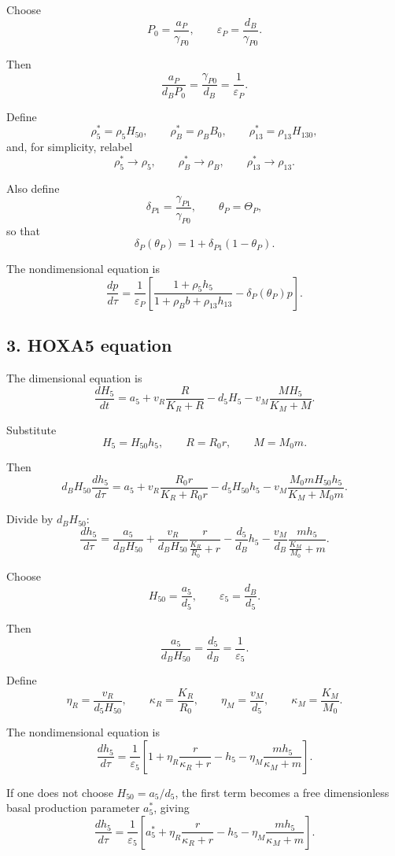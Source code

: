\documentclass[11pt]{article}
\begin{document}
Choose
\[
P_0=\frac{a_P}{\gamma_{P0}},
\qquad
\varepsilon_P=\frac{d_B}{\gamma_{P0}}.
\]

Then
\[
\frac{a_P}{d_BP_0}
=
\frac{\gamma_{P0}}{d_B}
=
\frac{1}{\varepsilon_P}.
\]

Define
\[
\rho_5^*=\rho_5H_{50},\qquad
\rho_B^*=\rho_BB_0,\qquad
\rho_{13}^*=\rho_{13}H_{130},
\]
and, for simplicity, relabel
\[
\rho_5^*\to \rho_5,\qquad
\rho_B^*\to \rho_B,\qquad
\rho_{13}^*\to \rho_{13}.
\]

Also define
\[
\delta_{P1}=\frac{\gamma_{P1}}{\gamma_{P0}},
\qquad
\theta_P=\Theta_P,
\]
so that
\[
\delta_P(\theta_P)=1+\delta_{P1}(1-\theta_P).
\]

The nondimensional equation is
\[
\boxed{
\frac{dp}{d\tau}
=
\frac{1}{\varepsilon_P}
\left[
\frac{1+\rho_5h_5}
{1+\rho_Bb+\rho_{13}h_{13}}
-
\delta_P(\theta_P)p
\right].
}
\]

\subsection{3. HOXA5 equation}

The dimensional equation is
\[
\frac{dH_5}{dt}
=
a_5
+
v_R\frac{R}{K_R+R}
-
d_5H_5
-
v_M\frac{MH_5}{K_M+M}.
\]

Substitute
\[
H_5=H_{50}h_5,\qquad R=R_0r,\qquad M=M_0m.
\]

Then
\[
d_BH_{50}\frac{dh_5}{d\tau}
=
a_5
+
v_R\frac{R_0r}{K_R+R_0r}
-
d_5H_{50}h_5
-
v_M\frac{M_0mH_{50}h_5}{K_M+M_0m}.
\]

Divide by \(d_BH_{50}\):
\[
\frac{dh_5}{d\tau}
=
\frac{a_5}{d_BH_{50}}
+
\frac{v_R}{d_BH_{50}}
\frac{r}{\frac{K_R}{R_0}+r}
-
\frac{d_5}{d_B}h_5
-
\frac{v_M}{d_B}
\frac{mh_5}{\frac{K_M}{M_0}+m}.
\]

Choose
\[
H_{50}=\frac{a_5}{d_5},
\qquad
\varepsilon_5=\frac{d_B}{d_5}.
\]

Then
\[
\frac{a_5}{d_BH_{50}}=\frac{d_5}{d_B}=\frac{1}{\varepsilon_5}.
\]

Define
\[
\eta_R=\frac{v_R}{d_5H_{50}},
\qquad
\kappa_R=\frac{K_R}{R_0},
\qquad
\eta_M=\frac{v_M}{d_5},
\qquad
\kappa_M=\frac{K_M}{M_0}.
\]

The nondimensional equation is
\[
\boxed{
\frac{dh_5}{d\tau}
=
\frac{1}{\varepsilon_5}
\left[
1
+
\eta_R\frac{r}{\kappa_R+r}
-
h_5
-
\eta_M\frac{mh_5}{\kappa_M+m}
\right].
}
\]

If one does not choose \(H_{50}=a_5/d_5\), the first term becomes a free dimensionless basal production parameter \(a_5^*\), giving
\[
\frac{dh_5}{d\tau}
=
\frac{1}{\varepsilon_5}
\left[
a_5^*
+
\eta_R\frac{r}{\kappa_R+r}
-
h_5
-
\eta_M\frac{mh_5}{\kappa_M+m}
\right].
\]
\end{document}
